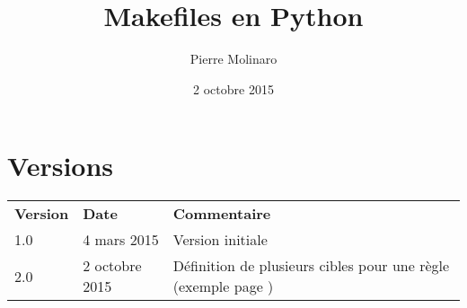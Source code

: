 \documentclass[a4paper,11pt]{extarticle}
\begin{document}
 


\title{\Huge{\textbf{Makefiles en Python}}}
\author{Pierre Molinaro}
\date {2 octobre 2015}

\maketitle


\tableofcontents


\section{Versions}
  \begin{tabular}{lll}
    \textbf{Version} & \textbf{Date} & \textbf{Commentaire}\\
    1.0 & 4 mars 2015 & Version initiale \\
    2.0 & 2 octobre 2015 & Définition de plusieurs cibles pour une règle (exemple page \pageref{plusieursCibles})\\
  \end{tabular}
\\~
\end{document}
